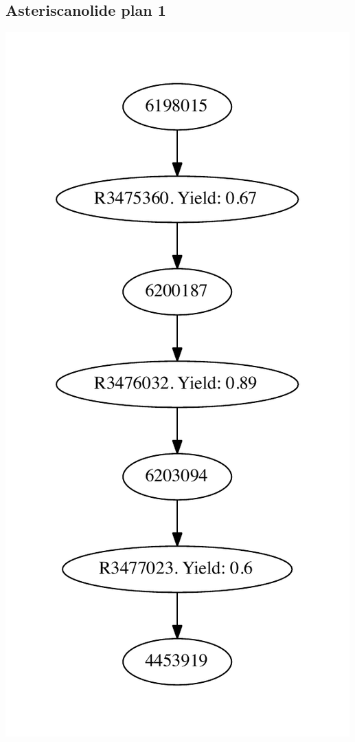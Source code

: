 \documentclass[a4paper,10pt,titlepage]{paper}
\begin{document}
\subsection{Asteriscanolide plan 1}
\centering
\includegraphics[scale=0.4]{Synteseplaner/Asteriscanolide/plan1.pdf}
\label{Appendix::Asteriscanolide1}
\end{document}
